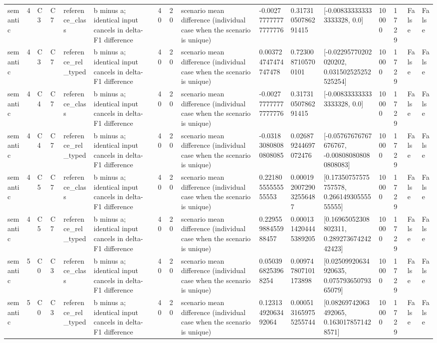 \begin{tabular}{llllllllllllllll}
semantic & 4 & C3 & C7 & reference\_class & b minus a; identical input cancels in delta-F1 difference & 40 & 20 & scenario mean difference (individual case when the scenario is unique) & -0.002777777777777776 & 0.31731050786291415 & [-0.008333333333333328, 0.0] & 10000 & 1729 & False & False \\
semantic & 4 & C3 & C7 & reference\_rel\_typed & b minus a; identical input cancels in delta-F1 difference & 40 & 20 & scenario mean difference (individual case when the scenario is unique) & 0.003724747474747478 & 0.7230087105700101 & [-0.02295770202020202, 0.031502525252525254] & 10000 & 1729 & False & False \\
semantic & 4 & C4 & C7 & reference\_class & b minus a; identical input cancels in delta-F1 difference & 40 & 20 & scenario mean difference (individual case when the scenario is unique) & -0.002777777777777776 & 0.31731050786291415 & [-0.008333333333333328, 0.0] & 10000 & 1729 & False & False \\
semantic & 4 & C4 & C7 & reference\_rel\_typed & b minus a; identical input cancels in delta-F1 difference & 40 & 20 & scenario mean difference (individual case when the scenario is unique) & -0.031830808080808085 & 0.026879244697072476 & [-0.05767676767676767, -0.008080808080808083] & 10000 & 1729 & False & False \\
semantic & 4 & C5 & C7 & reference\_class & b minus a; identical input cancels in delta-F1 difference & 40 & 20 & scenario mean difference (individual case when the scenario is unique) & 0.22180555555555553 & 0.00019200729032556487 & [0.17350757575757578, 0.26614930555555555] & 10000 & 1729 & False & False \\
semantic & 4 & C5 & C7 & reference\_rel\_typed & b minus a; identical input cancels in delta-F1 difference & 40 & 20 & scenario mean difference (individual case when the scenario is unique) & 0.22955988455988457 & 0.0001314204445389205 & [0.16965052308802311, 0.28927367424242423] & 10000 & 1729 & False & False \\
semantic & 5 & C0 & C3 & reference\_class & b minus a; identical input cancels in delta-F1 difference & 40 & 20 & scenario mean difference (individual case when the scenario is unique) & 0.0503968253968254 & 0.009747807101173898 & [0.02509920634920635, 0.07579365079365079] & 10000 & 1729 & False & False \\
semantic & 5 & C0 & C3 & reference\_rel\_typed & b minus a; identical input cancels in delta-F1 difference & 40 & 20 & scenario mean difference (individual case when the scenario is unique) & 0.12313492063492064 & 0.0005131659755255744 & [0.08269742063492065, 0.1630178571428571] & 10000 & 1729 & False & False \\

\end{tabular}
